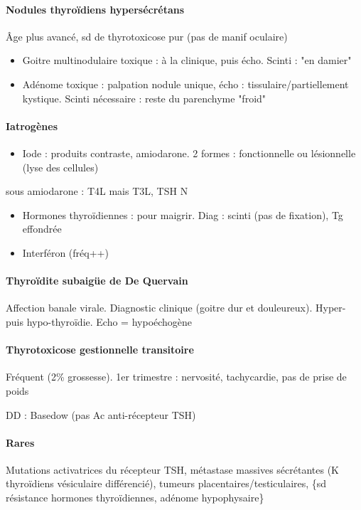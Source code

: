 \documentclass[11pt]{article}
\begin{document}
\paragraph{Nodules thyroïdiens hypersécrétans}
\label{sec:org1d9fb60}
Âge plus avancé, sd de thyrotoxicose pur (pas de manif oculaire) 
\begin{itemize}
\item Goitre multinodulaire toxique : à la clinique, puis écho. Scinti : "en damier"
\item Adénome toxique : palpation nodule unique, écho : tissulaire/partiellement
kystique. Scinti nécessaire : reste du parenchyme "froid"
\end{itemize}

\paragraph{Iatrogènes}
\label{sec:orgbb14be3}
\begin{itemize}
\item Iode : produits contraste, amiodarone. 2 formes : fonctionnelle ou lésionnelle
(lyse des cellules)
\end{itemize}
\danger sous amiodarone : T4L \inc mais T3L, TSH N 
\begin{itemize}
\item Hormones thyroïdiennes : pour maigrir. Diag : scinti (pas de fixation), Tg
effondrée
\item Interféron (fréq++)
\end{itemize}

\paragraph{Thyroïdite subaigüe de De Quervain}
\label{sec:orga7cc54b}
Affection banale virale. Diagnostic clinique (goitre dur et douleureux). Hyper-
puis hypo-thyroïdie. Echo = hypoéchogène

\paragraph{Thyrotoxicose gestionnelle transitoire}
\label{sec:orgb892d76}
Fréquent (2\% grossesse). 1er trimestre : nervosité, tachycardie, pas de prise de
poids

DD : Basedow (pas Ac anti-récepteur TSH)

\paragraph{Rares}
\label{sec:org95e55cb}
Mutations activatrices du récepteur TSH, métastase massives sécrétantes (K
thyroïdiens vésiculaire différencié), tumeurs placentaires/testiculaires, \{sd
résistance hormones thyroïdiennes, adénome hypophysaire\}
\end{document}
